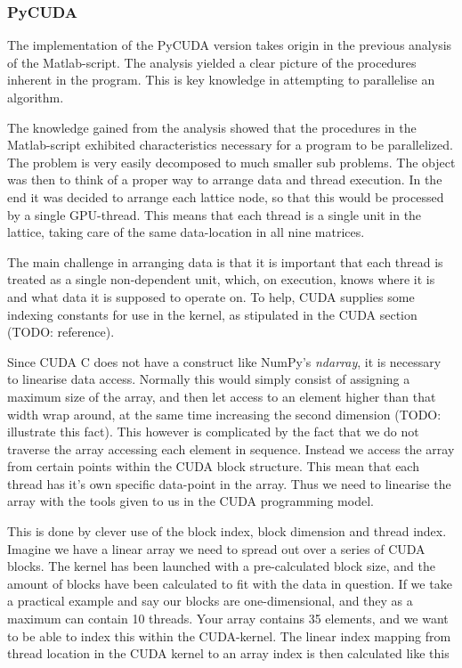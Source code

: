 \subsubsection{PyCUDA}
The implementation of the PyCUDA version takes origin in the previous analysis of the Matlab-script. The analysis yielded a clear picture of the procedures inherent in the program. This is key knowledge in attempting to parallelise an algorithm.

The knowledge gained from the analysis showed that the procedures in the Matlab-script exhibited characteristics necessary for a program to be parallelized. The problem is very easily decomposed to much smaller sub problems. The object was then to think of a proper way to arrange data and thread execution. In the end it was decided to arrange each lattice node, so that this would be processed by a single GPU-thread. This means that each thread is a single unit in the lattice, taking care of the same data-location in all nine matrices.

The main challenge in arranging data is that it is important that each thread is treated as a single non-dependent unit, which, on execution, knows where it is and what data it is supposed to operate on. To help, CUDA supplies some indexing constants for use in the kernel, as stipulated in the CUDA section (TODO: reference).

Since CUDA C does not have a construct like NumPy's \textit{ndarray}, it is necessary to linearise data access. Normally this would simply consist of assigning a maximum size of the array, and then let access to an element higher than that width wrap around, at the same time increasing the second dimension (TODO: illustrate this fact). This however is complicated by the fact that we do not traverse the array accessing each element in sequence. Instead we access the array from certain points within the CUDA block structure. This mean that each thread has it's own specific data-point in the array. Thus we need to linearise the array with the tools given to us in the CUDA programming model.

This is done by clever use of the block index, block dimension and thread index. Imagine we have a linear array we need to spread out over a series of CUDA blocks. The kernel has been launched with a pre-calculated block size, and the amount of blocks have been calculated to fit with the data in question. If we take a practical example and say our blocks are one-dimensional, and they as a maximum can contain 10 threads. Your array contains 35 elements, and we want to be able to index this within the CUDA-kernel. The linear index mapping from thread location in the CUDA kernel to an array index is then calculated like this

